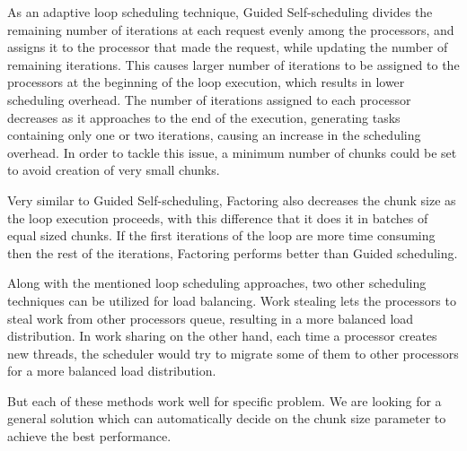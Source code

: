 As an adaptive loop scheduling technique, Guided Self-scheduling\cite{polychronopoulos1987guided} divides the remaining number of iterations at each request evenly among the processors, and assigns it to the processor that made the request, while updating the number of remaining iterations. This causes larger number of iterations to be assigned to the processors at the beginning of the loop execution, which results in lower scheduling overhead. The number of iterations assigned to each processor decreases as it approaches to the end of the execution, generating tasks containing only one or two iterations, causing an increase in the scheduling overhead. In order to tackle this issue, a minimum number of chunks could be set to avoid creation of very small chunks\cite{lilja1994exploiting}. 

Very similar to Guided Self-scheduling, Factoring\cite{hummel1992factoring} also decreases the chunk size as the loop execution proceeds, with this difference that it does it in batches of equal sized chunks. If the first iterations of the loop are more time consuming then the rest of the iterations, Factoring performs better than Guided scheduling\cite{mohammed2018experimental}.  


Along with the mentioned loop scheduling approaches, two other scheduling techniques can be utilized for load balancing. Work stealing\cite{blumofe1999scheduling} lets the processors to steal work from other processors queue, resulting in a more balanced load distribution. In work sharing on the other hand, each time a processor creates new threads, the scheduler would try to migrate some of them to other processors for a more balanced load distribution\cite{blumofe1999scheduling}.



But each of these methods work well for specific problem. We are looking for a general solution which can automatically decide on the chunk size parameter to achieve the best performance.

\vspace{\baselineskip}	
